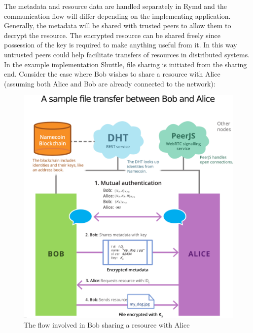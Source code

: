 The metadata and resource data are handled separately in Rymd and the communication flow will differ depending on the implementing application. Generally, the metadata will be shared with trusted peers to allow them to decrypt the resource. The encrypted resource can be shared freely since possession of the key is required to make anything useful from it. In this way untrusted peers could help facilitate transfers of resources in distributed systems. In the example implementation Shuttle, file sharing is initiated from the sharing end. Consider the case where Bob wishes to share a resource with Alice (assuming both Alice and Bob are already connected to the network):

\begin{figure}[h]
\centering
\includegraphics[width=\textwidth,height=0.4\paperheight,keepaspectratio
]{figures/flow}
\caption{The flow involved in Bob sharing a resource with Alice}
\label{fig:flow}
\end{figure}
